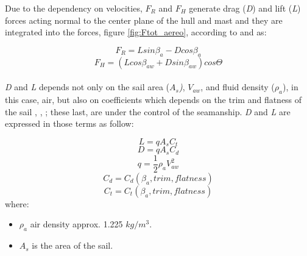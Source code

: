 Due to the dependency on velocities, $F_{R}$ and $F_{H}$ generate drag (\textit{D}) and lift (\textit{L}) forces acting normal to the center plane of the hull and mast and they are integrated into the forces, figure \ref{fig:Ftot_aereo}, according to \cite{philpott1993yacht} and \cite{claughton1998sailing} as: \par 
\begin{equation} \label{eq:Fr_LD}
    F_{R}=L sin \beta_{a} - D cos \beta_{a}
\end{equation}
\begin{equation} \label{eq:Fh_LD}
    F_{H}=(L cos \beta_{aw} + D sin \beta_{aw}) cos\Theta
\end{equation}
\\ \textit{D} and \textit{L} depends not only on  the sail area (\textit{$A_{s}$)}, $V_{aw}$, and fluid density ($\rho_{a}$), in this case, air, but also on coefficients which depends on the trim and flatness of the sail \cite{philpott1993yacht}, \cite{carrico17symp}, \cite{day2017performance}; these last, are under the control of the seamanship. \textit{D} and \textit{L}  are expressed in those terms as follow: \par
{}
\begin{equation} \label{eq:Lift}
  L=qA_{s}C_{t}  
\end{equation}
\begin{equation} \label{eq:Draf}
    D=qA_{s}C_{d}  
\end{equation}
\begin{equation} \label{eq:dynamic_press}
    q=\frac{1}{2}\rho_{a} V_{aw}^2
\end{equation}
\begin{equation} \label{eq:Cd}
    C_{d}=C_{d}(\beta_{a},trim, flatness)
\end{equation}
\begin{equation} \label{eq:Ct}
    C_{t}=C_{t}(\beta_{a},trim, flatness)
\end{equation}
where:
\begin{itemize} \label{ae_symbols}
    \item $\rho_{a}$ air density approx. 1.225 $kg/m^3$.
    \item $A_{s}$ is the area of the sail.
\end{itemize}


